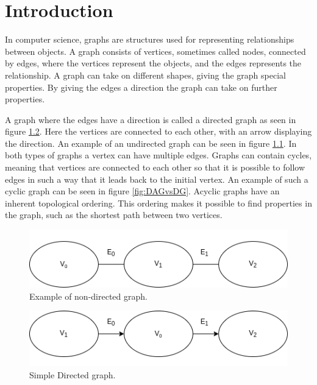 \chapter{Introduction}
\label{cha:Introduction}

In computer science, graphs are structures used for representing relationships between objects. A graph consists of vertices, sometimes called nodes, connected by edges, where the vertices represent the objects, and the edges represents the relationship. A graph can take on different shapes, giving the graph special properties. By giving the edges a direction the graph can take on further properties.

A graph where the edges have a direction is called a directed graph as seen in figure \ref{fig:DAG}. Here the vertices are connected to each other, with an arrow displaying the direction. An example of an undirected graph can be seen in figure \ref{fig:DAGvsAG}. In both types of graphs a vertex can have multiple edges. Graphs can contain cycles, meaning that vertices are connected to each other so that it is possible to follow edges in such a way that it leads back to the initial vertex. An example of such a cyclic graph can be seen in figure \ref{fig:DAGvsDG}. Acyclic graphs have an inherent topological ordering. This ordering makes it possible to find properties in the graph, such as the shortest path between two vertices.

\begin{figure}[h]
    \centering
    \includegraphics[scale=0.5]{figs/simpleAG.png}
    \caption{Example of non-directed graph.}
    \label{fig:DAGvsAG}
\end{figure}

\begin{figure}[h]
    \centering
    \includegraphics[scale=0.5]{figs/simpleDAG.png}
    \caption{Simple Directed graph.}
    \label{fig:DAG}
\end{figure}

